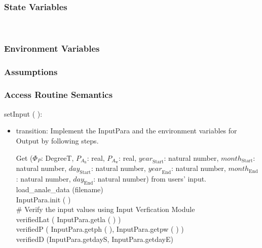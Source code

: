 \documentclass[12pt, titlepage]{article}
\begin{document}
\subsubsection{State Variables}
  \\

 

\subsubsection{Environment Variables}


\subsubsection{Assumptions}


\subsubsection{ Access Routine Semantics}

\noindent  setInput ( ):

\begin{itemize}
\item transition: Implement the InputPara and  the environment variables for Output by following steps.

Get ($\Phi_P$: DegreeT, $P_{A_{\text{h}}}$: real, $P_{A_{\text{w}}}$: real, $\mathit{year}_\text{Start}$: natural number, $\mathit{month}_\text{Start}$: natural number, $\mathit{day}_\text{Start}$: natural number, $\mathit{year}_\text{End}$: natural number, $\mathit{month}_\text{End}$: natural number, $\mathit{day}_\text{End}$: natural number) from users' input.\\


load\_anale\_data (filename)\\
InputPara.init ( )\\

$\#$ Verify the input values using Input Verfication Module\\
verifiedLat ( InputPara.getla ( ) )\\
verifiedP ( InputPara.getph ( ), InputPara.getpw ( ) )\\
verifiedD (InputPara.getdayS, InputPara.getdayE)\\


\end{itemize}
\end{document}
